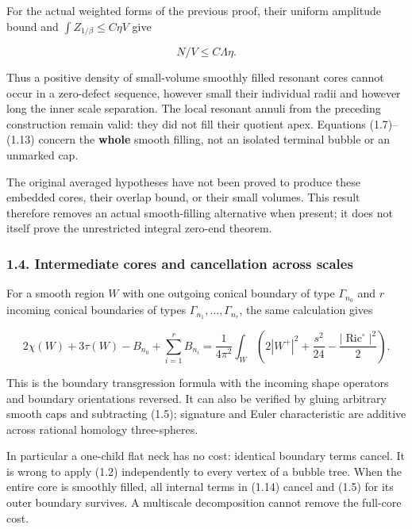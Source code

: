 \documentclass[
  10pt,
]{article}
\begin{document}
For the actual weighted forms of the previous proof, their uniform
amplitude bound and \(\int Z_{1/\beta}\le C\eta V\) give

\[
                         N/V\le C\Lambda\eta.       \tag{1.13}
\]

Thus a positive density of small-volume smoothly filled resonant cores
cannot occur in a zero-defect sequence, however small their individual
radii and however long the inner scale separation. The local resonant
annuli from the preceding construction remain valid: they did not fill
their quotient apex. Equations (1.7)--(1.13) concern the \textbf{whole}
smooth filling, not an isolated terminal bubble or an unmarked cap.

The original averaged hypotheses have not been proved to produce these
embedded cores, their overlap bound, or their small volumes. This result
therefore removes an actual smooth-filling alternative when present; it
does not itself prove the unrestricted integral zero-end theorem.

\hypertarget{intermediate-cores-and-cancellation-across-scales}{%
\subsubsection{1.4. Intermediate cores and cancellation across
scales}\label{intermediate-cores-and-cancellation-across-scales}}

For a smooth region \(W\) with one outgoing conical boundary of type
\(\Gamma_{n_0}\) and \(r\) incoming conical boundaries of types
\(\Gamma_{n_1},\ldots,\Gamma_{n_r}\), the same calculation gives

\[
 2\chi(W)+3\tau(W)-B_{n_0}+\sum_{i=1}^r B_{n_i}
   =\frac1{4\pi^2}\int_W
     \left(2|W^+|^2+\frac{s^2}{24}
                         -\frac{|\operatorname{Ric}^{\circ}|^2}{2}\right).
                                                        \tag{1.14}
\]

This is the boundary transgression formula with the incoming shape
operators and boundary orientations reversed. It can also be verified by
gluing arbitrary smooth caps and subtracting (1.5); signature and Euler
characteristic are additive across rational homology three-spheres.

In particular a one-child flat neck has no cost: identical boundary
terms cancel. It is wrong to apply (1.2) independently to every vertex
of a bubble tree. When the entire core is smoothly filled, all internal
terms in (1.14) cancel and (1.5) for its outer boundary survives. A
multiscale decomposition cannot remove the full-core cost.
\end{document}
